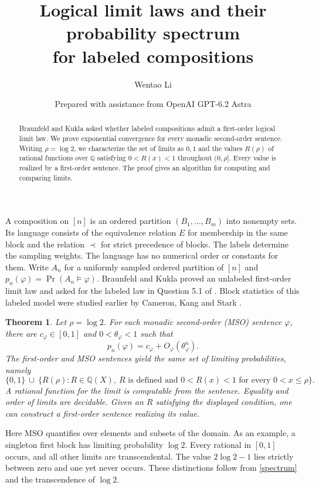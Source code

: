 \documentclass[11pt]{article}
\title{Logical limit laws and their probability spectrum\\for labeled compositions}
\author{Wentao Li}
\date{Prepared with assistance from OpenAI GPT-6.2 Astra}
\newtheorem{theorem}{Theorem}
\newcommand{\Q}{\mathbb Q}
\begin{document}
\maketitle
\begin{abstract}
Braunfeld and Kukla asked whether labeled compositions admit a first-order logical limit law. We prove exponential convergence for every monadic second-order sentence. Writing $\rho=\log 2$, we characterize the set of limits as $0,1$ and the values $R(\rho)$ of rational functions over $\Q$ satisfying $0<R(x)<1$ throughout $(0,\rho]$. Every value is realized by a first-order sentence. The proof gives an algorithm for computing and comparing limits.
\end{abstract}

A composition on $[n]$ is an ordered partition $(B_1,\ldots,B_m)$ into nonempty sets. Its language consists of the equivalence relation $E$ for membership in the same block and the relation $\prec$ for strict precedence of blocks. The labels determine the sampling weights. The language has no numerical order or constants for them. Write $A_n$ for a uniformly sampled ordered partition of $[n]$ and $p_n(\varphi)=\Pr(A_n\models\varphi)$. Braunfeld and Kukla proved an unlabeled first-order limit law and asked for the labeled law in Question 5.1 of \cite{bk}. Block statistics of this labeled model were studied earlier by Cameron, Kang and Stark \cite{cks}.

\begin{theorem}\label{main}
Let $\rho=\log 2$. For each monadic second-order (MSO) sentence $\varphi$, there are $c_\varphi\in[0,1]$ and $0<\theta_\varphi<1$ such that
\[
             p_n(\varphi)=c_\varphi+O_\varphi(\theta_\varphi^n).
\]
The first-order and MSO sentences yield the same set of limiting probabilities, namely
\begin{equation}
 \{0,1\}\ \cup\
 \{R(\rho): R\in\Q(X),\ R\text{ is defined and }0<R(x)<1
                       \text{ for every }0<x\le\rho\}.           \label{spectrum}
\end{equation}
A rational function for the limit is computable from the sentence. Equality and order of limits are decidable. Given an $R$ satisfying the displayed condition, one can construct a first-order sentence realizing its value.
\end{theorem}

Here MSO quantifies over elements and subsets of the domain. As an example, a singleton first block has limiting probability $\log 2$. Every rational in $[0,1]$ occurs, and all other limits are transcendental. The value $2\log 2-1$ lies strictly between zero and one yet never occurs. These distinctions follow from \eqref{spectrum} and the transcendence of $\log 2$.
\end{document}
